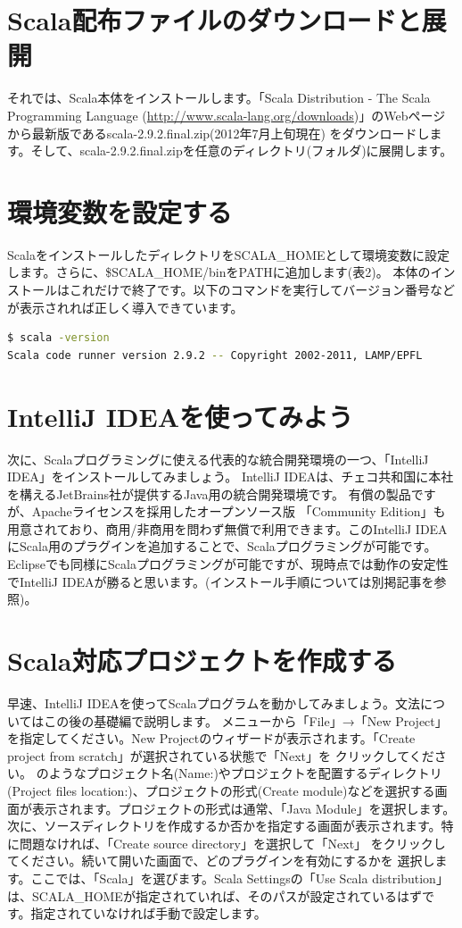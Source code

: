 \section{Scala配布ファイルのダウンロードと展開}
それでは、Scala本体をインストールします。「Scala Distribution - The Scala Programming Language (\url{http://www.scala-lang.org/downloads})」のWebページから最新版であるscala-2.9.2.final.zip(2012年7月上旬現在) をダウンロードします。そして、scala-2.9.2.final.zipを任意のディレクトリ(フォルダ)に展開します。
\section{環境変数を設定する}
ScalaをインストールしたディレクトリをSCALA\_HOMEとして環境変数に設定します。さらに、\$SCALA\_HOME/binをPATHに追加します(表2)。 本体のインストールはこれだけで終了です。以下のコマンドを実行してバージョン番号などが表示されれば正しく導入できています。

\begin{lstlisting}[language=bash, frame=none]
$ scala -version
Scala code runner version 2.9.2 -- Copyright 2002-2011, LAMP/EPFL
\end{lstlisting}

\section{IntelliJ IDEAを使ってみよう}
次に、Scalaプログラミングに使える代表的な統合開発環境の一つ、「IntelliJ IDEA」をインストールしてみましょう。 IntelliJ IDEAは、チェコ共和国に本社を構えるJetBrains社が提供するJava用の統合開発環境です。 有償の製品ですが、Apacheライセンスを採用したオープンソース版 「Community Edition」も用意されており、商用/非商用を問わず無償で利用できます。このIntelliJ IDEAにScala用のプラグインを追加することで、Scalaプログラミングが可能です。Eclipseでも同様にScalaプログラミングが可能ですが、現時点では動作の安定性でIntelliJ IDEAが勝ると思います。(インストール手順については別掲記事を参照)。

\section{Scala対応プロジェクトを作成する}
早速、IntelliJ IDEAを使ってScalaプログラムを動かしてみましょう。文法についてはこの後の基礎編で説明します。 メニューから「File」→「New Project」を指定してください。New Projectのウィザードが表示されます。「Create project from scratch」が選択されている状態で「Next」を クリックしてください。 のようなプロジェクト名(Name:)やプロジェクトを配置するディレクトリ(Project files location:)、プロジェクトの形式(Create module)などを選択する画面が表示されます。プロジェクトの形式は通常、「Java Module」を選択します。 次に、ソースディレクトリを作成するか否かを指定する画面が表示されます。特に問題なければ、「Create source directory」を選択して「Next」 をクリックしてください。続いて開いた画面で、どのプラグインを有効にするかを 選択します。ここでは、「Scala」を選びます。Scala Settingsの「Use Scala distribution」は、SCALA\_HOMEが指定されていれば、そのパスが設定されているはずです。指定されていなければ手動で設定します。

